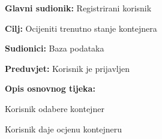 			\noindent {}
			\begin{packed_item}
				
				\item \textbf{Glavni sudionik:} Registrirani korisnik
				\item  \textbf{Cilj:} Ocijeniti trenutno stanje kontejnera
				\item  \textbf{Sudionici:} Baza podataka
				\item  \textbf{Preduvjet:} Korisnik je prijavljen
				\item  \textbf{Opis osnovnog tijeka:}
				
				\item[] \begin{packed_enum}
					
					\item Korisnik odabere kontejner
					\item Korisnik daje ocjenu kontejneru
					
				\end{packed_enum}
			\end{packed_item}
			
